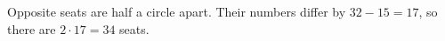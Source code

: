 Opposite seats are half a circle apart. Their numbers differ by $32-15=17$, so there are $2\cdot17=\boxed{34}$ seats.
